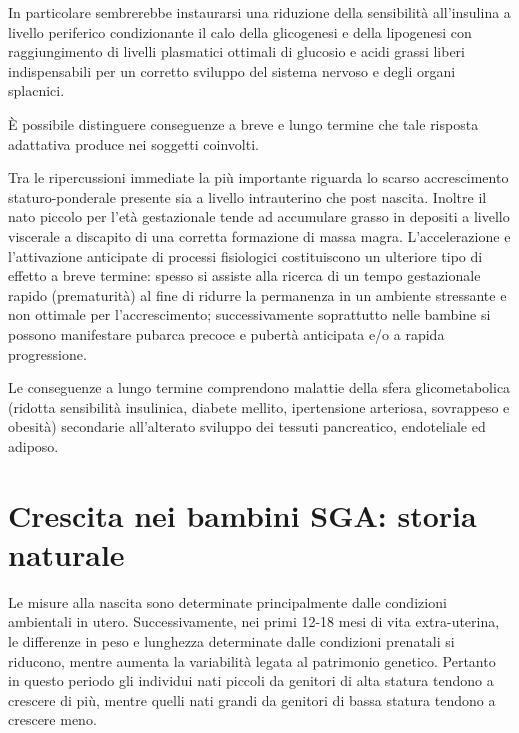 In particolare sembrerebbe instaurarsi una riduzione della sensibilità all'insulina
a livello periferico condizionante il calo della glicogenesi e della lipogenesi
con raggiungimento di livelli plasmatici ottimali di glucosio e acidi grassi liberi
indispensabili per un corretto sviluppo del sistema nervoso e degli organi splacnici.\cite{sga-51}



\`E possibile distinguere conseguenze a breve e lungo termine che tale risposta
adattativa produce nei soggetti coinvolti.

Tra le ripercussioni immediate la più importante riguarda lo scarso accrescimento
staturo-ponderale presente sia a livello intrauterino che post nascita. Inoltre 
il nato piccolo per l'età gestazionale tende ad accumulare grasso in depositi a livello
viscerale a discapito di una corretta formazione di massa magra. L'accelerazione e 
l'attivazione anticipate di processi fisiologici costituiscono un ulteriore tipo di 
effetto a breve termine: spesso si assiste alla ricerca di un tempo gestazionale
rapido (prematurità) al fine di ridurre la permanenza in un ambiente stressante
e non ottimale per l'accrescimento\cite{sga-53}; successivamente soprattutto nelle bambine si possono manifestare pubarca precoce e pubertà anticipata e/o a rapida progressione. 

Le conseguenze a lungo termine comprendono malattie della sfera glicometabolica (ridotta sensibilità insulinica, diabete mellito,
ipertensione arteriosa, sovrappeso e obesità) secondarie all'alterato sviluppo dei tessuti pancreatico, endoteliale ed adiposo.\cite{sga-32}


\section{Crescita nei bambini SGA: storia naturale}

Le misure alla nascita sono determinate principalmente dalle condizioni ambientali in utero. Successivamente, nei primi 12-18 mesi di vita extra-uterina, le differenze in peso e lunghezza determinate dalle condizioni prenatali si riducono, mentre aumenta la variabilità legata al patrimonio genetico. Pertanto in questo periodo gli individui nati piccoli da genitori di alta statura tendono a crescere di più, mentre quelli nati grandi da genitori di bassa statura tendono a crescere meno. 


